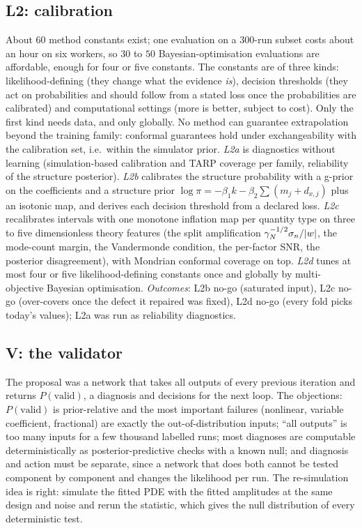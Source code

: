 \subsection{L2: calibration}
About $60$ method constants exist; one evaluation on a $300$-run subset costs about an hour on six workers, so $30$ to $50$ Bayesian-optimisation evaluations are affordable, enough for four or five constants. The constants are of three kinds: likelihood-defining (they change what the evidence \emph{is}), decision thresholds (they act on probabilities and should follow from a stated loss once the probabilities are calibrated) and computational settings (more is better, subject to cost). Only the first kind needs data, and only globally. No method can guarantee extrapolation beyond the training family: conformal guarantees hold under exchangeability with the calibration set, i.e.\ within the simulator prior.
\emph{L2a} is diagnostics without learning (simulation-based calibration and TARP coverage per family, reliability of the structure posterior). \emph{L2b} calibrates the structure probability with a g-prior on the coefficients and a structure prior $\log\pi=-\beta_1k-\beta_2\sum(m_j+d_{x,j})$ plus an isotonic map, and derives each decision threshold from a declared loss.
\emph{L2c} recalibrates intervals with one monotone inflation map per quantity type on three to five dimensionless theory features (the split amplification $\gamma_{N}^{-1/2}\sigma_{n}/\lvert w\rvert$, the mode-count margin, the Vandermonde condition, the per-factor SNR, the posterior disagreement), with Mondrian conformal coverage on top.
\emph{L2d} tunes at most four or five likelihood-defining constants once and globally by multi-objective Bayesian optimisation. \emph{Outcomes}: L2b no-go (saturated input), L2c no-go (over-covers once the defect it repaired was fixed), L2d no-go (every fold picks today's values); L2a was run as reliability diagnostics.

\subsection{V: the validator}
The proposal was a network that takes all outputs of every previous iteration and returns $P(\text{valid})$, a diagnosis and decisions for the next loop. The objections: $P(\text{valid})$ is prior-relative and the most important failures (nonlinear, variable coefficient, fractional) are exactly the out-of-distribution inputs;
``all outputs'' is too many inputs for a few thousand labelled runs; most diagnoses are computable deterministically as posterior-predictive checks with a known null; and diagnosis and action must be separate, since a network that does both cannot be tested component by component and changes the likelihood per run.
The re-simulation idea is right: simulate the fitted PDE with the fitted amplitudes at the same design and noise and rerun the statistic, which gives the null distribution of every deterministic test.

